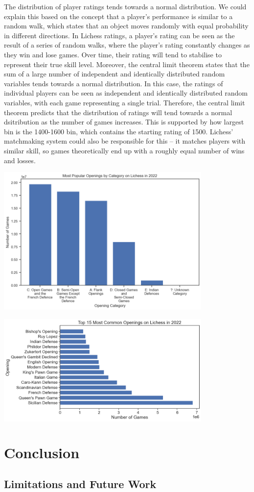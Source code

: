 \documentclass[a4paper, 11pt]{article}
\begin{document}
The distribution of player ratings tends towards a normal distribution. We could explain this based on the concept that a player's performance is similar to a random walk, which states that an object moves randomly with equal probability in different directions. In Lichess ratings, a player's rating can be seen as the result of a series of random walks, where the player's rating constantly changes as they win and lose games. Over time, their rating will tend to stabilise to represent their true skill level. Moreover, the central limit theorem states that the sum of a large number of independent and identically distributed random variables tends towards a normal distribution. In this case, the ratings of individual players can be seen as independent and identically distributed random variables, with each game representing a single trial. Therefore, the central limit theorem predicts that the distribution of ratings will tend towards a normal dsitribution as the number of games increases. This is supported by how largest bin is the 1400-1600 bin, which contains the starting rating of 1500. Lichess' matchmaking system could also be responsible for this -- it matches players with similar skill, so games theoretically end up with a roughly equal number of wins and losses.

\begin{center}
    \includegraphics[width=0.8\textwidth]{Most Popular Openings by Category.png}
\end{center}

\begin{center}
    \includegraphics[width=0.8\textwidth]{Most Popular Openings.png}
\end{center}

\section{Conclusion}

\subsection{Limitations and Future Work}



\end{document}
